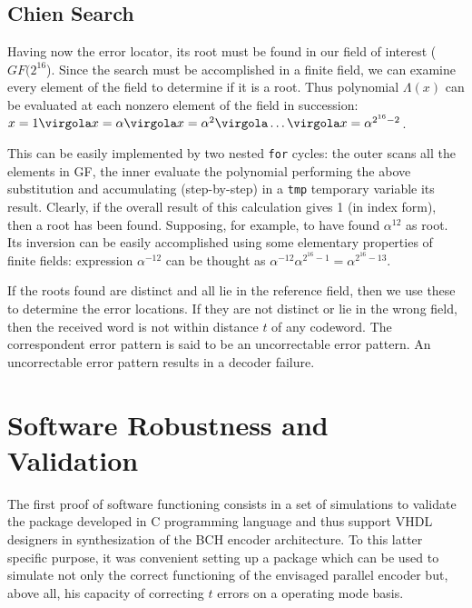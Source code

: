 \subsection{Chien Search}

Having now the error locator, its root must be found in our field of interest (\(GF(2^{16}\)). Since the search must be accomplished in a finite field, we can examine every element of the field to determine if it is a root. Thus polynomial \(\Lambda(x)\) can be evaluated at each nonzero element of the field in succession: \(x=1 \virgola x= \alpha \virgola x = \alpha^2 \virgola \ldots \virgola x= \alpha^{2^{16}-2} \).

This can be easily implemented by two nested \texttt{for} cycles: the outer scans all the elements in GF, the inner evaluate the polynomial performing the above substitution and accumulating (step-by-step) in a \texttt{tmp} temporary variable its result. Clearly, if the overall result of this calculation gives 1 (in index form), then a root has been found. Supposing, for example, to have found \(\alpha^{12}\) as root. Its inversion can be easily accomplished using some elementary properties of finite fields: expression \(\alpha^{-12}\) can be thought as \(\alpha^{-12}\alpha^{2^{16}-1} = \alpha^{2^{16}-13}\).

If the roots found are distinct and all lie in the reference field, then we use these to determine the error locations. If they are not distinct or lie in the wrong field, then the received word is not within distance \(t\) of any codeword. The correspondent error pattern is said to be an uncorrectable error pattern. An uncorrectable error pattern results in a decoder failure.

\section{Software Robustness and Validation}

The first proof of software functioning consists in a set of simulations to validate the package developed in C programming language and thus support VHDL designers in synthesization of the BCH encoder architecture. To this latter specific purpose, it was convenient setting up a package which can be used to simulate not only the correct functioning of the envisaged parallel encoder but, above all, his capacity of correcting \(t\) errors on a operating mode basis.

